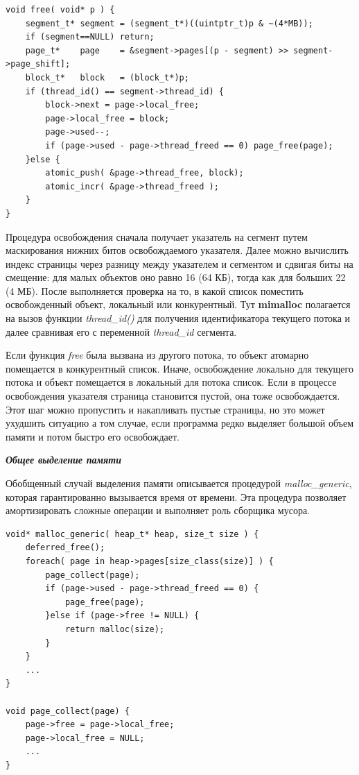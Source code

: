 \begin{lstlisting}
void free( void* p ) {
	segment_t* segment = (segment_t*)((uintptr_t)p & ~(4*MB));
	if (segment==NULL) return;
	page_t*    page    = &segment->pages[(p - segment) >> segment->page_shift];
	block_t*   block   = (block_t*)p;
	if (thread_id() == segment->thread_id) {
		block->next = page->local_free;
		page->local_free = block;
		page->used--;
		if (page->used - page->thread_freed == 0) page_free(page);
	}else {
		atomic_push( &page->thread_free, block);
		atomic_incr( &page->thread_freed );
	}
}
\end{lstlisting}

Процедура освобождения сначала получает указатель на сегмент путем маскирования нижних битов освобождаемого указателя. Далее можно вычислить индекс страницы через разницу между указателем и сегментом и сдвигая биты на смещение: для малых объектов оно равно 16 (64 КБ), тогда как для больших 22 (4 МБ). После выполняется проверка на то, в какой список поместить освобожденный объект, локальный или конкурентный. Тут \textbf{mimalloc} полагается на вызов функции \textit{thread\_id()} для получения идентификатора текущего потока и далее сравнивая его с переменной \textit{thread\_id} сегмента.

Если функция \textit{free} была вызвана из другого потока, то объект атомарно помещается в конкурентный список. Иначе, освобождение локально для текущего потока и объект помещается в локальный для потока список. Если в процессе освобождения указателя страница становится пустой, она тоже освобождается. Этот шаг можно пропустить и накапливать пустые страницы, но это может ухудшить ситуацию а том случае, если программа редко выделяет большой объем памяти и потом быстро его освобождает.

\bigbreak
\textit{\textbf{Общее выделение памяти}}

Обобщенный случай выделения памяти описывается процедурой \textit{malloc\_generic}, которая гарантированно вызывается время от времени. Эта процедура позволяет амортизировать сложные операции и выполняет роль сборщика мусора.

\begin{lstlisting}
void* malloc_generic( heap_t* heap, size_t size ) {
	deferred_free();
	foreach( page in heap->pages[size_class(size)] ) {
		page_collect(page);
		if (page->used - page->thread_freed == 0) {
			page_free(page);
		}else if (page->free != NULL) {
			return malloc(size);
		}
	}
	...
}

void page_collect(page) {
	page->free = page->local_free;
	page->local_free = NULL;
	...
}
\end{lstlisting}

